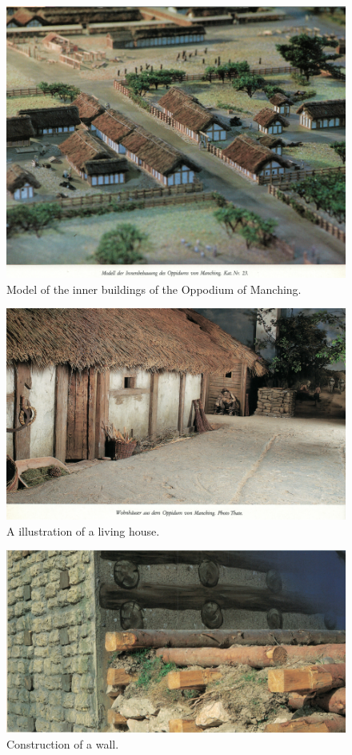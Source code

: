 \begin{figure}[ht]
	\centering
	\includegraphics[width=\linewidth]{pictures/scan_manching_2.png}
	\caption{Model of the inner buildings of the  Oppodium of Manching.}
\end{figure}

\begin{figure}[ht]
	\centering
	\includegraphics[width=\linewidth]{pictures/scan_manching_1.png}
	\caption{A illustration of a living house.}
\end{figure}

\begin{figure}[ht]
	\centering
	\includegraphics[width=\linewidth]{pictures/scan_manching_4.png}
	\caption{Construction of a wall.}
\end{figure}


